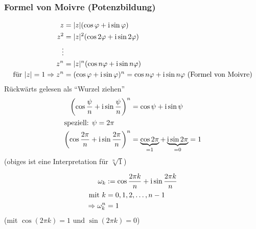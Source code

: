 \subsubsection*{Formel von Moivre (Potenzbildung)}
\begin{align*}
	z &= |z|(\cos \varphi + \operatorname{i} \sin \varphi) \\
	z^2 &= |z|^2(\cos 2\varphi + \operatorname{i} \sin 2\varphi) \\
	\vdots \\
	z^n &= |z|^n(\cos n\varphi + \operatorname{i} \sin n\varphi) \\
	\text{für } |z| = 1 \Rightarrow z^n &= (\cos \varphi + \operatorname{i} \sin \varphi)^n = \cos n\varphi + \operatorname{i} \sin n\varphi \text{ (Formel von Moivre)}
\end{align*}
%
Rückwärts gelesen als ``Wurzel ziehen''
\begin{align*}
	\left(\cos\frac{\psi}{n} + \operatorname{i} \sin\frac{\psi}{n}\right)^n &= \cos \psi + \operatorname{i} \sin \psi \\
	\intertext{speziell: $\psi = 2\pi$}
	\left(\cos\frac{2\pi}{n} + \operatorname{i} \sin\frac{2\pi}{n}\right)^n &= \underbrace{\cos 2\pi}_{=1} + \underbrace{\operatorname{i} \sin 2\pi}_{=0} = 1 \\
\end{align*}
(obiges ist eine Interpretation für $\sqrt[n]{1}$)

\begin{definition}
	\begin{align*}
		\omega_k &:= \cos\frac{2\pi k}{n} + \operatorname{i} \sin\frac{2\pi k}{n} \\
		\text{mit } k &= 0, 1, 2, \ldots, n - 1 \\
		\Rightarrow \omega_k^n &= 1
	\end{align*}
	(mit $\cos \left(2\pi k\right) = 1 \text{ und } \sin \left(2\pi k\right) = 0$)
\end{definition}

